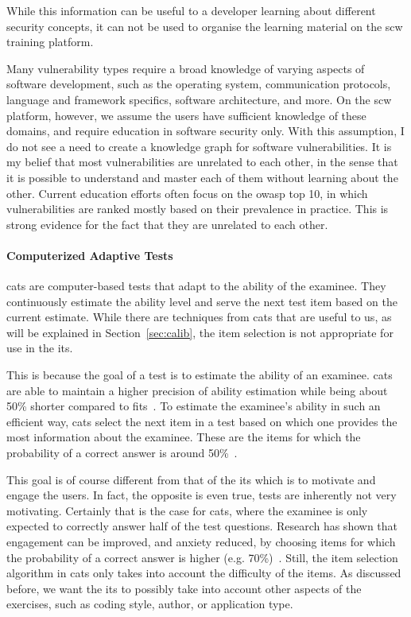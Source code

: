 While this information can be useful to a developer learning about different security concepts, it can not be used to organise the learning material on the \gls{scw} training platform.

Many vulnerability types require a broad knowledge of varying aspects of software development, such as the operating system, communication protocols, language and framework specifics, software architecture, and more.
On the \gls{scw} platform, however, we assume the users have sufficient knowledge of these domains, and require education in software security only.
With this assumption, I do not see a need to create a knowledge graph for software vulnerabilities.
It is my belief that most vulnerabilities are unrelated to each other, in the sense that it is possible to understand and master each of them without learning about the other.
Current education efforts often focus on the \gls{owasp} top 10, in which vulnerabilities are ranked mostly based on their prevalence in practice.
This is strong evidence for the fact that they are unrelated to each other.

\paragraph{Computerized Adaptive Tests}
\Glspl{cat} are computer-based tests that adapt to the ability of the examinee. 
They continuously estimate the ability level and serve the next test item based on the current estimate.
While there are techniques from \glspl{cat} that are useful to us, as will be explained in Section~\ref{sec:calib}, the item selection is not appropriate for use in the \gls{its}.

This is because the goal of a test is to estimate the ability of an examinee. \Glspl{cat} are able to maintain a higher precision of ability estimation while being about 50\% shorter compared to \glspl{fit}~\cite{weiss1984application}.
To estimate the examinee's ability in such an efficient way, \glspl{cat} select the next item in a test based on which one provides the most information about the examinee. 
These are the items for which the probability of a correct answer is around 50\%~\cite{magis2017computerized, ling2017computerized}.

This goal is of course different from that of the \gls{its} which is to motivate and engage the users. 
In fact, the opposite is even true, tests are inherently not very motivating.
Certainly that is the case for \glspl{cat}, where the examinee is only expected to correctly answer half of the test questions.
Research has shown that engagement can be improved, and anxiety reduced, by choosing items for which the probability of a correct answer is higher (e.g. 70\%)~\cite{ling2017computerized}. 
Still, the item selection algorithm in \glspl{cat} only takes into account the difficulty of the items. 
As discussed before, we want the \gls{its} to possibly take into account other aspects of the exercises, such as coding style, author, or application type.